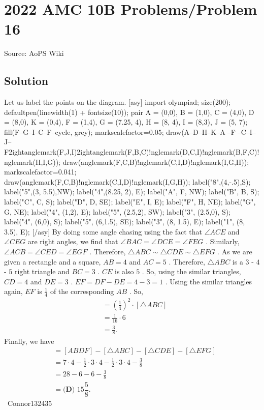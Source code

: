\documentclass[12pt]{article}
\begin{document}
\section*{{2022 AMC 10B Problems/Problem 16}}
Source: AoPS Wiki

\subsection*{Solution}
Let us label the points on the diagram. [asy] import olympiad; size(200); defaultpen(linewidth(1) + fontsize(10)); pair A = (0,0), B = (1,0), C = (4,0), D = (8,0), K = (0,4), F = (1,4), G = (7.25, 4), H = (8, 4), I = (8,3), J = (5, 7); fill(F--G--I--C--F--cycle, grey); markscalefactor=0.05; draw(A--D--H--K--A^^B--F^^F--C--I--J--F^^rightanglemark(F,J,I)^^rightanglemark(F,B,C)^^anglemark(D,C,I)^^anglemark(B,F,C)^^anglemark(H,I,G)); draw(anglemark(F,C,B)^^anglemark(C,I,D)^^anglemark(I,G,H)); markscalefactor=0.041; draw(anglemark(F,C,B)^^anglemark(C,I,D)^^anglemark(I,G,H)); label("8",(4,-.5),S); label("5",(3, 5.5),NW); label("4",(8.25, 2), E); label("A", F, NW); label("B", B, S); label("C", C, S); label("D", D, SE); label("E", I, E); label("F", H, NE); label("G", G, NE); label("4", (1,2), E); label("5", (2.5,2), SW); label("3", (2.5,0), S); label("4", (6,0), S); label("5", (6,1.5), SE); label("3", (8, 1.5), E); label("1", (8, 3.5), E); [/asy] By doing some angle chasing using the fact that $\angle ACE$ and $\angle CEG$ are right angles, we find that $\angle BAC = \angle DCE = \angle FEG$ . Similarly, $\angle ACB = \angle CED = \angle EGF$ . Therefore, $\triangle ABC \sim \triangle CDE \sim \triangle EFG$ . As we are given a rectangle and a square, $AB = 4$ and $AC = 5$ . Therefore, $\triangle ABC$ is a $3$ - $4$ - $5$ right triangle and $BC = 3$ . $CE$ is also $5$ . So, using the similar triangles, $CD = 4$ and $DE = 3$ . $EF = DF - DE = 4 - 3 = 1$ . Using the similar triangles again, $EF$ is $\frac14$ of the corresponding $AB$ . So, \begin{align*} [\triangle EFG] &= \left(\frac14\right)^2 \cdot [\triangle ABC] \\ &= \frac{1}{16} \cdot 6 \\ &= \frac38. \end{align*} Finally, we have \begin{align*} [ACEG] &= [ABDF] - [\triangle ABC] - [\triangle CDE] - [\triangle EFG] \\ &= 7 \cdot 4 - \frac12 \cdot 3 \cdot 4 - \frac12 \cdot 3 \cdot 4 - \frac38 \\ &= 28 - 6 - 6 - \frac38 \\ &= \boxed{\textbf{(D) }15\dfrac{5}{8}}. \end{align*} ~Connor132435
\end{document}

